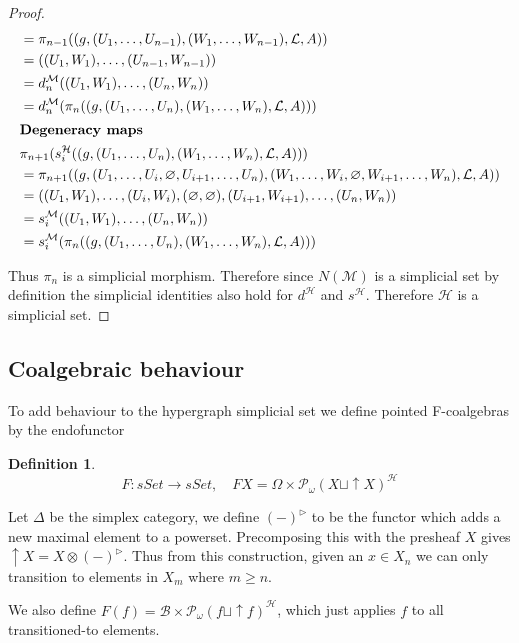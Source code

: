 \documentclass[12pt]{article}
\theoremstyle{definition}
\newtheorem{definition}{Definition}[section]
\newcommand{\1}{\mathbbm{1}}
\newcommand{\B}{\mathcal{B}}
\newcommand{\M}{\mathcal{M}}
\renewcommand{\H}{\mathcal{H}}
\newcommand{\finP}{\mathcal{P}_{\omega}}
\begin{document}
\begin{proof}
\begin{align*}
        &= \pi_{n-1}((g, (U_1, \ldots, U_{n-1}), (W_1, \ldots, W_{n-1}), \mathcal{L}, A)) \\
        &= ((U_1, W_1), \ldots, (U_{n-1}, W_{n-1})) \\
        &= d_n^\mathcal{M}((U_1, W_1), \ldots, (U_n, W_n)) \\
        &= d_n^\mathcal{M}(\pi_n((g, (U_1, \ldots, U_n), (W_1, \ldots, W_n), \mathcal{L}, A)))\\
        \intertext{\textbf{Degeneracy maps}}
        &\pi_{n+1}(s_i^\mathcal{H}((g, (U_1, \ldots, U_n), (W_1, \ldots, W_n), \mathcal{L}, A))) \\
        &= \pi_{n+1}((g, (U_1, \ldots, U_i, \varnothing, U_{i+1}, \ldots, U_n), (W_1, \ldots, W_i, \varnothing, W_{i+1}, \ldots, W_n), \mathcal{L}, A)) \\
        &= ((U_1, W_1), \ldots, (U_i, W_i), (\varnothing, \varnothing), (U_{i+1}, W_{i+1}), \ldots, (U_n, W_n)) \\
        &= s_i^\mathcal{M}((U_1, W_1), \ldots, (U_n, W_n)) \\
        &= s_i^\mathcal{M}(\pi_n((g, (U_1, \ldots, U_n), (W_1, \ldots, W_n), \mathcal{L}, A)))
    \end{align*}

    Thus $\pi_n$ is a simplicial morphism. Therefore since $N(\M)$ is a simplicial set by definition the simplicial identities also hold for $d^{\H}$ and $s^{\H}$. Therefore $\H$ is a simplicial set.
\end{proof}

\subsection{Coalgebraic behaviour}
To add behaviour to the hypergraph simplicial set we define pointed F-coalgebras by the endofunctor

\begin{definition}
    \[
        F: sSet \to sSet, \quad FX = \Omega \times \finP(X \sqcup \uparrow X)^{\H}
    \]
    
    Let $\Delta$ be the simplex category, we define $(-)^{\rhd}$ to be the functor which adds a new maximal element to a powerset. Precomposing this with the presheaf $X$ gives $\uparrow X = X\otimes (-)^{\rhd}$. Thus from this construction, given an $x\in X_n$ we can only transition to elements in $X_m$ where $m\geq n$.
    
    We also define $F(f) = \B\times\finP(f \sqcup \uparrow f)^{\H}$, which just applies $f$ to all transitioned-to elements.
\end{definition}
\end{document}
